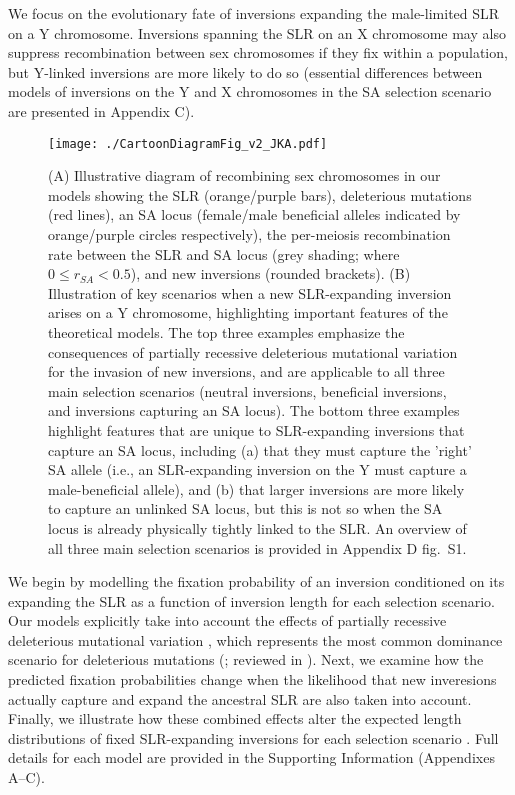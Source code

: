 \documentclass{article}[12pt]
\begin{document}
We focus on the evolutionary fate of inversions expanding the male-limited SLR on a Y chromosome. Inversions spanning the SLR on an X chromosome may also suppress recombination between sex chromosomes if they fix within a population, but Y-linked inversions are more likely to do so (essential differences between models of inversions on the Y and X chromosomes in the SA selection scenario are presented in Appendix C). 



 \begin{figure}[H]
 \centering
 \texttt{[image: ./CartoonDiagramFig\_v2\_JKA.pdf]}
 \caption{(A) Illustrative diagram of recombining sex chromosomes in our models showing the SLR (orange/purple bars), deleterious mutations (red lines), an SA locus (female/male beneficial alleles indicated by orange/purple circles respectively), the per-meiosis recombination rate between the SLR and SA locus (grey shading; where $0 \leq r_{SA} < 0.5$), and new inversions (rounded brackets). (B) Illustration of key scenarios when a new SLR-expanding inversion arises on a Y chromosome, highlighting important features of the theoretical models. The top three examples emphasize the consequences of partially recessive deleterious mutational variation for the invasion of new inversions, and are applicable to all three main selection scenarios (neutral inversions, beneficial inversions, and inversions capturing an SA locus). The bottom three examples highlight features that are unique to SLR-expanding inversions that capture an SA locus, including (a) that they must capture the 'right' SA allele (i.e., an SLR-expanding inversion on the Y must capture a male-beneficial allele), and (b) that larger inversions are more likely to capture an unlinked SA locus, but this is not so when the SA locus is already physically tightly linked to the SLR. An overview of all three main selection scenarios is provided in Appendix D fig.~S1.}
 \label{fig:diagramFig}
 \end{figure}

We begin by modelling the fixation probability of an inversion conditioned on its expanding the SLR as a function of inversion length for each selection scenario. Our models explicitly take into account the effects of partially recessive deleterious mutational variation \citep[after][]{Olito-etal-2022}, which represents the most common dominance scenario for deleterious mutations (\citealt{AgrawalWhitlock2012,Manna2011,Huber2018}; reviewed in \citealt{Billiard-etal-2021}). Next, we examine how the predicted fixation probabilities change when the likelihood that new inveresions actually capture and expand the ancestral SLR are also taken into account. Finally, we illustrate how these combined effects alter the expected length distributions of fixed SLR-expanding inversions for each selection scenario \citep[as in][]{ConnallonOlito2021}. Full details for each model are provided in the Supporting Information (Appendixes A--C).
\end{document}
